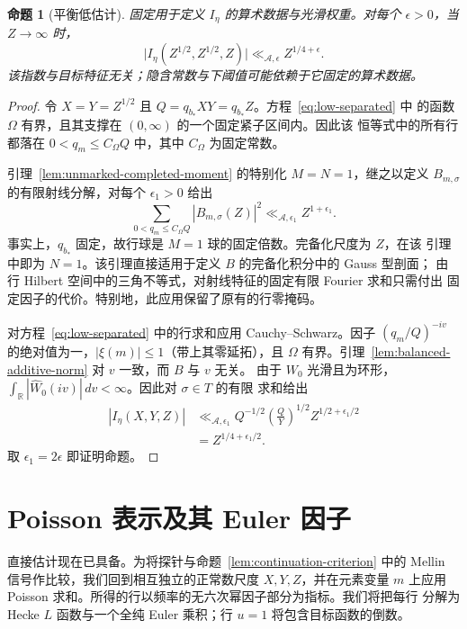 \documentclass[11pt,a4paper]{article}
\numberwithin{equation}{section}
\numberwithin{figure}{section}
\newtheorem{proposition}[theorem]{命题}
\theoremstyle{definition}
\theoremstyle{remark}
\begin{document}
\begin{proposition}[平衡低估计]
\label{prop:balanced-low}
固定用于定义 $I_\eta$ 的算术数据与光滑权重。对每个 $\epsilon>0$，当
$Z\to\infty$ 时，
\[
 \bigl|I_\eta(Z^{1/2},Z^{1/2},Z)\bigr|
 \ll_{\mathcal A,\epsilon} Z^{1/4+\epsilon}.
\]
该指数与目标特征无关；隐含常数与下阈值可能依赖于它固定的算术数据。
\end{proposition}

\begin{proof}
令 $X=Y=Z^{1/2}$ 且 $Q=q_{b_*}XY=q_{b_*}Z$。方程~\eqref{eq:low-separated} 中
的函数 $\Omega$ 有界，且其支撑在 $(0,\infty)$ 的一个固定紧子区间内。因此该
恒等式中的所有行都落在 $0<q_m\le C_\Omega Q$ 中，其中 $C_\Omega$ 为固定常数。

引理~\ref{lem:unmarked-completed-moment} 的特别化 $M=N=1$，继之以定义
$B_{m,\sigma}$ 的有限射线分解，对每个 $\epsilon_1>0$ 给出
\[
 \sum_{0<q_m\le C_\Omega Q}|B_{m,\sigma}(Z)|^2
 \ll_{\mathcal A,\epsilon_1} Z^{1+\epsilon_1}.
\]
事实上，$q_{b_*}$ 固定，故行球是 $M=1$ 球的固定倍数。完备化尺度为 $Z$，在该
引理中即为 $N=1$。该引理直接适用于定义 $B$ 的完备化积分中的 Gauss 型剖面；
由行 Hilbert 空间中的三角不等式，对射线特征的固定有限 Fourier 求和只需付出
固定因子的代价。特别地，此应用保留了原有的行零掩码。

对方程~\eqref{eq:low-separated} 中的行求和应用 Cauchy--Schwarz。因子
$(q_m/Q)^{-iv}$ 的绝对值为一，$|\xi(m)|\le1$（带上其零延拓），且 $\Omega$
有界。引理~\ref{lem:balanced-additive-norm} 对 $v$ 一致，而 $B$ 与 $v$ 无关。
由于 $W_0$ 光滑且为环形，
$\int_{\mathbb R}|\widehat W_0(iv)|\,dv<\infty$。因此对 $\sigma\in T$ 的有限
求和给出
\[
 \begin{split}
 |I_\eta(X,Y,Z)|
 &\ll_{\mathcal A,\epsilon_1}
 Q^{-1/2}\left(\frac QY\right)^{1/2}Z^{1/2+\epsilon_1/2}\\
 &=Z^{1/4+\epsilon_1/2}.
 \end{split}
\]
取 $\epsilon_1=2\epsilon$ 即证明命题。
\end{proof}

\section{Poisson 表示及其 Euler 因子}
\label{sec:poisson-representation}

直接估计现在已具备。为将探针与命题~\ref{lem:continuation-criterion} 中的
Mellin 信号作比较，我们回到相互独立的正常数尺度 $X,Y,Z$，并在元素变量 $m$
上应用 Poisson 求和。所得的行以频率的无六次幂因子部分为指标。我们将把每行
分解为 Hecke $L$ 函数与一个全纯 Euler 乘积；行 $u=1$ 将包含目标函数的倒数。
\end{document}
